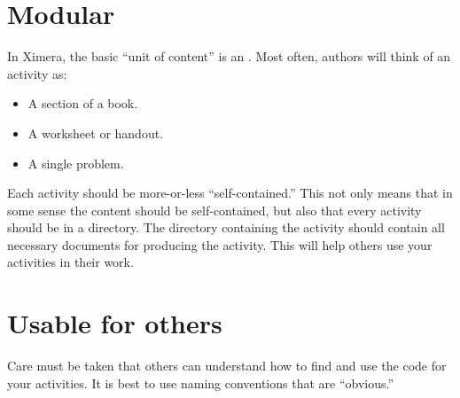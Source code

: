 \documentclass{ximera}
\begin{document}
\section{Modular}

In Ximera, the basic ``unit of content'' is an . Most
often, authors will think of an activity as:
\begin{itemize}
\item A section of a book.
\item A worksheet or handout.
\item A single problem.
\end{itemize}
Each activity should be more-or-less ``self-contained.'' This not only
means that in some sense the content should be self-contained, but
also that every activity should be in a directory. The directory
containing the activity should contain all necessary documents for
producing the activity.  This will help others use your activities in
their work.


\section{Usable for others}

Care must be taken that others can understand how to find and use the
code for your activities. It is best to use naming conventions that
are ``obvious.'' 
\end{document}
